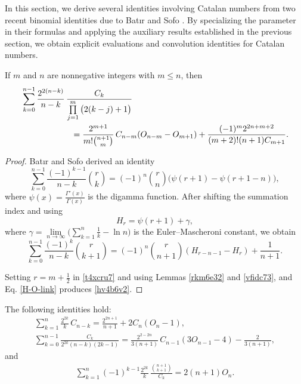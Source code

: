\documentclass[12pt,reqno]{article}
\begin{document}
In this section, we derive several identities involving Catalan numbers from two recent binomial identities due 
to Bat\i r and Sofo \cite{batirsofo23}. By specializing the parameter in their formulas and applying the auxiliary results 
established in the previous section, we obtain explicit evaluations and convolution identities for Catalan numbers.
\begin{proposition}
If $m$ and $n$ are nonnegative integers with $m\leq n$, then
\begin{align}
&\sum_{k = 0}^{n - 1} \frac{2^{2(n-k)}}{ n - k}\,\frac{C_k}{\prod\limits_{j = 1}^m \big(2(k - j) + 1\big)} 
\notag\\
&\qquad\qquad\qquad= \frac{2^{m + 1}}{m!\binom{n+1}{m}}\, C_{n - m}( O_{n - m} - O_{m + 1}) + \frac{{( - 1)^m 2^{2n+m + 2} }}{( {m + 2} )!(n + 1)C_{m + 1} }\label{hv4b6v2}.
\end{align}
\end{proposition}
\begin{proof}
Bat\i r and Sofo derived an identity \cite[Theorem 2.2]{batirsofo23}
\begin{equation*}
\sum_{k = 0}^{n - 1} \frac{(-1)^{k-1}}{n-k} \binom{r}{k} = ( - 1)^n \binom{r}{n} \big( \psi(r+1) - \psi(r+1-n)\big),
\end{equation*}
where $\psi(x)=\frac{\Gamma'(x)}{\Gamma(x)}$ is the digamma function.  
After shifting the summation index and using
\begin{equation}
H_r = \psi(r+1)+\gamma, \label{Hn-psi}
\end{equation}
where $\gamma = \lim\limits_{n\to \infty} \Big(\sum_{k=1}^n\frac1{k}-\ln n\Big)$ is the Euler--Mascheroni constant, we obtain
\begin{equation}\label{t4xcru7}
\sum_{k = 0}^{n - 1} \frac{(- 1)^k}{n - k}\binom{r}{k + 1} = (- 1)^n \binom{r}{n + 1}(H_{r - n - 1} - H_r) + \frac{1}{n + 1}.
\end{equation}

Setting $r=m+\frac12$ in \eqref{t4xcru7} and using Lemmas \ref{rkm6e32} and \ref{vfidc73}, and Eq. \eqref{H-O-link} produces \eqref{hv4b6v2}.
\end{proof}
\begin{corollary} 
The following identities hold:
\begin{gather*}
\sum_{k = 1}^n \frac{2^{2k}}{k}\,C_{n - k} = \frac{{2^{2n + 1} }}{n + 1} + 2C_n ( O_n  - 1),\\
\sum_{k = 0}^{n-1} \frac{C_k }{2^{2k} (n-k)(2k-1)} = \frac{2^{2-2n}}{3(n+1)}\,C_{n-1}(3O_{n-1}-4)- \frac{2}{3(n+1)},
\end{gather*}
and
\begin{gather*}
\sum_{k = 1}^{n} (-1)^{k-1}\frac{2^{2k}}{k}\,\frac{\binom{n+1}{k+1}}{C_k} = 2(n+1)O_{n}.
\end{gather*}
\end{corollary}
\end{document}

